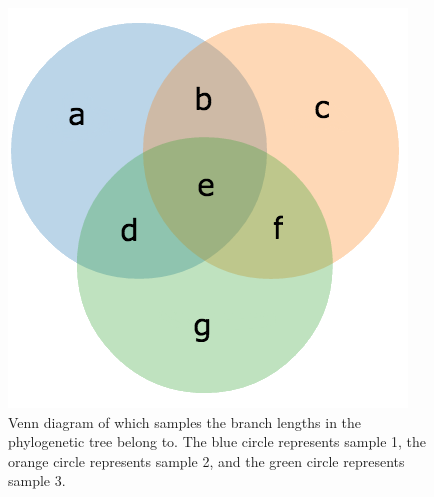 \documentclass[10pt,letterpaper]{article}
\begin{document}
\begin{figure}[h!]
  \centering
  \caption{Venn diagram of which samples the branch lengths in the phylogenetic tree belong to. The blue circle represents sample 1, the orange circle represents sample 2, and the green circle represents sample 3.}
    \includegraphics[width=80ex]{venn_diagram.png}
\end{figure}
\end{document}
